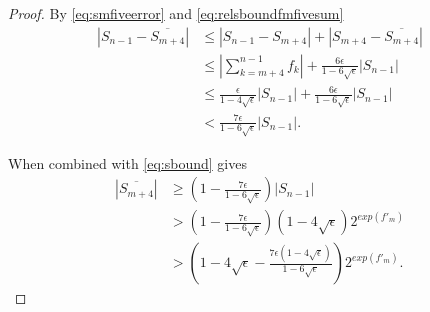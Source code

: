 \documentclass[12pt]{article}
\providecommand{\exp}{\ensuremath{\text{exp}}}
\theoremstyle{definition}
\numberwithin{equation}{section}
\numberwithin{figure}{section}
\begin{document}
\begin{proof}
    By \eqref{eq:smfiveerror} and \eqref{eq:relsboundfmfivesum}
    \begin{align}
    |S_{n-1} - \overline{S_{m+4}}|
        & \leq |S_{n-1} - S_{m+4}| + |S_{m+4} - \overline{S_{m+4}}| \nonumber \\
        & \leq |\sum_{k=m+4}^{n-1} f_k| + \frac{6\epsilon}{1-6\sqrt{\epsilon}} |S_{n-1}| \nonumber \\
        & \leq \frac{\epsilon}{1 - 4 \sqrt\epsilon}|S_{n-1}| + \frac{6\epsilon}{1-6\sqrt{\epsilon}} |S_{n-1}| \nonumber \\
        & <  \frac{7\epsilon}{1-6\sqrt{\epsilon}} |S_{n-1}|.
        \label{eq:smfiveerror-1}
    \end{align}

    When combined with \eqref{eq:sbound} gives
    \begin{align*}
    |\overline{S_{m+4}}| 
        & \geq (1-\frac{7 \epsilon}{1-6\sqrt{\epsilon}}) |S_{n-1}| \\
        & > (1-\frac{7 \epsilon}{1-6\sqrt{\epsilon}}) (1-4\sqrt{\epsilon}) 2^{exp(f'_m)} \\
        & > (1-4\sqrt{\epsilon} - \frac{7 \epsilon (1-4\sqrt{\epsilon})}{1-6\sqrt{\epsilon}}) 2^{exp(f'_m)}. 
    \end{align*}

\end{proof}
\end{document}
